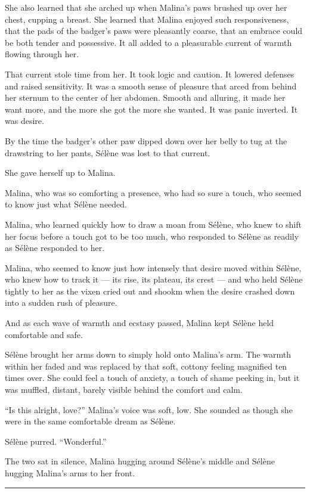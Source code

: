 She also learned that she arched up when Malina's paws brushed up over her chest, cupping a breast. She learned that Malina enjoyed such responsiveness, that the pads of the badger's paws were pleasantly coarse, that an embrace could be both tender and possessive. It all added to a pleasurable current of warmth flowing through her.

That current stole time from her. It took logic and caution. It lowered defenses and raised sensitivity. It was a smooth sense of pleasure that arced from behind her sternum to the center of her abdomen. Smooth and alluring, it made her want more, and the more she got the more she wanted. It was panic inverted. It was desire.

By the time the badger's other paw dipped down over her belly to tug at the drawstring to her pants, Sélène was lost to that current.

She gave herself up to Malina.

Malina, who was so comforting a presence, who had so sure a touch, who seemed to know just what Sélène needed.

Malina, who learned quickly how to draw a moan from Sélène, who knew to shift her focus before a touch got to be too much, who responded to Sélène as readily as Sélène responded to her.

Malina, who seemed to know just how intensely that desire moved within Sélène, who knew how to track it --- its rise, its plateau, its crest --- and who held Sélène tightly to her as the vixen cried out and shookm when the desire crashed down into a sudden rush of pleasure.

And as each wave of warmth and ecstasy passed, Malina kept Sélène held comfortable and safe.

Sélène brought her arms down to simply hold onto Malina's arm. The warmth within her faded and was replaced by that soft, cottony feeling magnified ten times over. She could feel a touch of anxiety, a touch of shame peeking in, but it was muffled, distant, barely visible behind the comfort and calm.

``Is this alright, love?'' Malina's voice was soft, low. She sounded as though she were in the same comfortable dream as Sélène.

Sélène purred. ``Wonderful.''

The two sat in silence, Malina hugging around Sélène's middle and Sélène hugging Malina's arms to her front.

\begin{center}\rule{0.5\linewidth}{\linethickness}\end{center}

